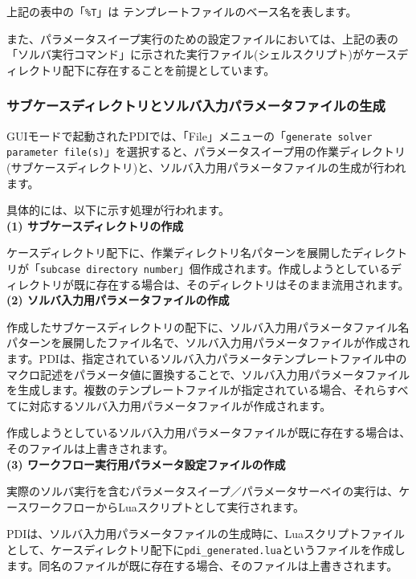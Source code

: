 \documentclass[a4paper,11pt]{jarticle}
\begin{document}
{上記の表中の「{\tt \%T}」は テンプレートファイルのベース名を表します。

また、パラメータスイープ実行のための設定ファイルにおいては、上記の表の「ソルバ実行コマンド」に示された実行ファイル(シェルスクリプト)がケースディレクトリ配下に存在することを前提としています。


\subsubsection{サブケースディレクトリとソルバ入力パラメータファイルの生成}

GUIモードで起動されたPDIでは、「File」メニューの「{\tt generate solver parameter file(s)}」を選択すると、パラメータスイープ用の作業ディレクトリ(サブケースディレクトリ)と、ソルバ入力用パラメータファイルの生成が行われます。

具体的には、以下に示す処理が行われます。\\

\textbf{(1) サブケースディレクトリの作成}

ケースディレクトリ配下に、作業ディレクトリ名パターンを展開したディレクトリが「{\tt subcase directory number}」個作成されます。作成しようとしているディレクトリが既に存在する場合は、そのディレクトリはそのまま流用されます。\\

\textbf{(2) ソルバ入力用パラメータファイルの作成}

作成したサブケースディレクトリの配下に、ソルバ入力用パラメータファイル名パターンを展開したファイル名で、ソルバ入力用パラメータファイルが作成されます。PDIは、指定されているソルバ入力パラメータテンプレートファイル中のマクロ記述をパラメータ値に置換することで、ソルバ入力用パラメータファイルを生成します。複数のテンプレートファイルが指定されている場合、それらすべてに対応するソルバ入力用パラメータファイルが作成されます。

作成しようとしているソルバ入力用パラメータファイルが既に存在する場合は、そのファイルは上書きされます。\\

\textbf{(3) ワークフロー実行用パラメータ設定ファイルの作成}

実際のソルバ実行を含むパラメータスイープ／パラメータサーベイの実行は、ケースワークフローからLuaスクリプトとして実行されます。

PDIは、ソルバ入力用パラメータファイルの生成時に、Luaスクリプトファイルとして、ケースディレクトリ配下に{\tt pdi\_generated.lua}というファイルを作成します。同名のファイルが既に存在する場合、そのファイルは上書きされます。

}
\end{document}
